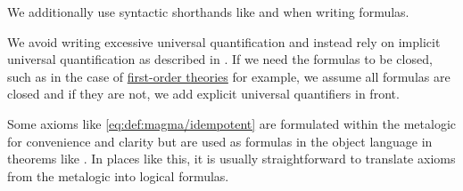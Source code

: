 \begin{remark}
\begin{thmenum}
     We additionally use syntactic shorthands like  and  when writing formulas.

     We avoid writing excessive universal quantification and instead rely on implicit universal quantification as described in . If we need the formulas to be closed, such as in the case of \hyperref[def:first_order_theory]{first-order theories} for example, we assume all formulas are closed and if they are not, we add explicit universal quantifiers in front.
  \end{thmenum}

  Some axioms like \eqref{eq:def:magma/idempotent} are formulated within the metalogic for convenience and clarity but are used as formulas in the object language in theorems like . In places like this, it is usually straightforward to translate axioms from the metalogic into logical formulas.
\end{remark}


